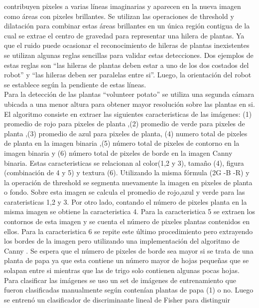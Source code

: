 	contribuyen pixeles a varias líneas imaginarias y aparecen en la 
	nueva imagen como áreas con pixeles brillantes. Se utilizan las 
	operaciones de threshold y dilatación para combinar estas áreas 
	brillantes en un única región contigua de la cual se 
	extrae el centro de gravedad para representar una hilera de 
	plantas. Ya que el ruido puede ocasionar el reconocimiento de 
	hileras de plantas inexistentes se utilizan algunas reglas 
	sencillas para validar estas detecciones. Dos ejemplos de estas 
	reglas son ``las hileras de plantas deben estar a uno de los dos 
	costados del robot'' y ``las hileras deben ser paralelas entre si''.
	Luego, la orientación del robot se establece según la pendiente de 
	estas líneas.\\
	\indent Para la detección de las plantas ``volunteer potato'' se 
	utiliza una segunda cámara ubicada a una menor altura para obtener 
	mayor resolución sobre las plantas en si. El algoritmo consiste en 
	extraer las siguientes caracteristicas de las imágenes: (1) 
	promedio de rojo para pixeles de planta ,(2) promedio de verde para 
	pixeles de planta ,(3) promedio de azul para pixeles de planta, (4) 
	numero total de pixeles de planta en la imagen binaria ,(5) número 
	total de pixeles de contorno en la imagen binaria y (6) número 
	total de pixeles de borde en la imagen Canny binaria. Estas 
	caracteristicas se relacionan al color(1,2 y 3), tamaño (4), figura 
	(combinación de 4 y 5) y textura (6).  Utilizando la misma fórmula 
	(2G -B -R) y la operación de threshold se segmenta nuevamente la imagen 
	 en pixeles de planta o fondo. Sobre esta imagen se calcula el 
	 promedio de rojo,azul y verde para las carateristicas 1,2 y 3. 
	 Por otro lado, contando el número de pixeles planta en la misma 
	 imagen se obtiene la caracteristica 4. Para la caracteristica 5 
	 se extraen los contornos de esta imagen y se cuenta el número de 
	 pixeles plantas contenidos en ellos. Para la caracteristica 6 se 
	 repite este último procedimiento pero extrayendo los bordes de la 
	 imagen pero  
	 utilizando una implementación del algoritmo de Canny 
	 \cite{Canny:1986:ACA}. Se espera que el número de pixeles de 
	 borde sea mayor si se trata de una planta de papa ya que esta 
	 contiene un número mayor de hojas pequeñas que se solapan entre si 
	 mientras que las de trigo solo contienen algunas pocas hojas. Para 
	 clasificar las imágenes se uso un set de imágenes de entrenamiento
	 que fueron clasificadas manualmente según contenían 
	 plantas de papa (1) o no. Luego se entrenó un 
	 clasificador de discriminante lineal de Fisher \cite{HastieEtAl2008} para distinguir 
